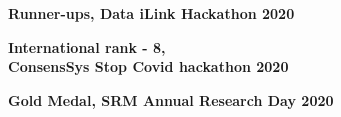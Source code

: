 \documentclass[10pt,a4paper,ragged2e]{altacv}
\begin{document}
\smallskip
\faTrophy\large{\textbf{ Runner-ups, Data iLink Hackathon 2020}}
\begin{itemize}
\begin{comment}\item[\faTrophy] Participated in 'SRM Research Day 2020', held on 28th February 2020 held by SRM IST and
Successfully bagged \textbf{Gold Medal} for Research Paper on 'SRM Research Day 2020'\end{comment}
\end{itemize}
\smallskip

\faTrophy\large{\textbf{ International rank - 8, \\\hspace{2.5ex}ConsensSys Stop Covid hackathon 2020}}
\begin{itemize}
\begin{comment}\item[\faTrophy] Participated in 'SRM Research Day 2020', held on 28th February 2020 held by SRM IST and
Successfully bagged \textbf{Gold Medal} for Research Paper on 'SRM Research Day 2020'\end{comment}
\end{itemize}
\smallskip

\faTrophy\large{\textbf{ Gold Medal, SRM Annual Research Day 2020}}
\begin{itemize}
\begin{comment}\item[\faTrophy] Participated in 'SRM Research Day 2020', held on 28th February 2020 held by SRM IST and
Successfully bagged \textbf{Gold Medal} for Research Paper on 'SRM Research Day 2020'\end{comment}
\end{itemize}
\smallskip
\end{document}

